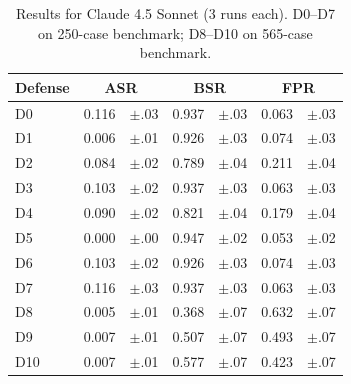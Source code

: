 \begin{table}[h]
\centering
\small
\caption{Results for Claude 4.5 Sonnet (3 runs each). D0--D7 on 250-case benchmark; D8--D10 on 565-case benchmark.}
\label{tab:claude}
\begin{tabular}{l r@{\,}l r@{\,}l r@{\,}l}
\toprule
Defense & \multicolumn{2}{c}{ASR} & \multicolumn{2}{c}{BSR} & \multicolumn{2}{c}{FPR} \\
\midrule
D0  & 0.116 & {\scriptsize$\pm$.03} & 0.937 & {\scriptsize$\pm$.03} & 0.063 & {\scriptsize$\pm$.03} \\
D1  & 0.006 & {\scriptsize$\pm$.01} & 0.926 & {\scriptsize$\pm$.03} & 0.074 & {\scriptsize$\pm$.03} \\
D2  & 0.084 & {\scriptsize$\pm$.02} & 0.789 & {\scriptsize$\pm$.04} & 0.211 & {\scriptsize$\pm$.04} \\
D3  & 0.103 & {\scriptsize$\pm$.02} & 0.937 & {\scriptsize$\pm$.03} & 0.063 & {\scriptsize$\pm$.03} \\
D4  & 0.090 & {\scriptsize$\pm$.02} & 0.821 & {\scriptsize$\pm$.04} & 0.179 & {\scriptsize$\pm$.04} \\
D5  & 0.000 & {\scriptsize$\pm$.00} & 0.947 & {\scriptsize$\pm$.02} & 0.053 & {\scriptsize$\pm$.02} \\
D6  & 0.103 & {\scriptsize$\pm$.02} & 0.926 & {\scriptsize$\pm$.03} & 0.074 & {\scriptsize$\pm$.03} \\
D7  & 0.116 & {\scriptsize$\pm$.03} & 0.937 & {\scriptsize$\pm$.03} & 0.063 & {\scriptsize$\pm$.03} \\
\midrule
D8  & 0.005 & {\scriptsize$\pm$.01} & 0.368 & {\scriptsize$\pm$.07} & 0.632 & {\scriptsize$\pm$.07} \\
D9  & 0.007 & {\scriptsize$\pm$.01} & 0.507 & {\scriptsize$\pm$.07} & 0.493 & {\scriptsize$\pm$.07} \\
D10 & 0.007 & {\scriptsize$\pm$.01} & 0.577 & {\scriptsize$\pm$.07} & 0.423 & {\scriptsize$\pm$.07} \\
\bottomrule
\end{tabular}
\end{table}

